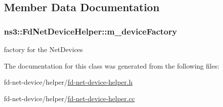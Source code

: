\subsection{Member Data Documentation}
\subsubsection[{\texorpdfstring{m\+\_\+device\+Factory}{m_deviceFactory}}]{ ns3\+::\+Fd\+Net\+Device\+Helper\+::m\+\_\+device\+Factory\hspace{0.3cm}{\ttfamily [private]}}\hypertarget{classns3_1_1FdNetDeviceHelper_a68ff62237281b17bbd72fde746ce6826}{}\label{classns3_1_1FdNetDeviceHelper_a68ff62237281b17bbd72fde746ce6826}


factory for the Net\+Devices 



The documentation for this class was generated from the following files\+:\begin{DoxyCompactItemize}
\item 
fd-\/net-\/device/helper/\hyperlink{fd-net-device-helper_8h}{fd-\/net-\/device-\/helper.\+h}\item 
fd-\/net-\/device/helper/\hyperlink{fd-net-device-helper_8cc}{fd-\/net-\/device-\/helper.\+cc}\end{DoxyCompactItemize}

